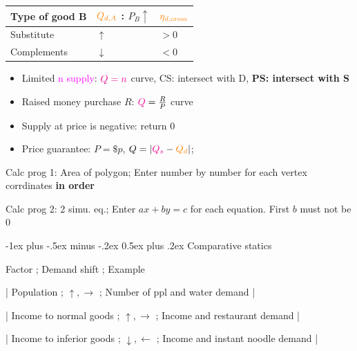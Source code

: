 \documentclass[a4paper]{article}
\makeatletter
\renewcommand{\section}{\@startsection{section}{1}{0mm}%
                                {-1ex plus -.5ex minus -.2ex}%
                                {0.5ex plus .2ex}%
                                {\normalfont\large\bfseries}}
\makeatother
\begin{document}
\begin{multicols*}{3}
    \begin{minipage}{\linewidth}
        \begin{tabular}{l|l|l}
            Type of good B & $\textcolor{orange}{Q_{d,A}}$ : $P_B \uparrow$ & $\textcolor{orange}{\eta_{d,\text{cross}}}$ \\
            \hline
            Substitute     & $\uparrow$                                     & $>0$                                        \\
            Complements    & $\downarrow$                                   & $<0$                                        \\
        \end{tabular}
    \end{minipage}

    \begin{itemize}
        \item Limited \textcolor{magenta}{n supply}: $\textcolor{magenta}{Q=n}$ curve, CS: intersect with D, \textbf{PS: intersect with S}
        \item Raised money purchase $R$: $\textcolor{magenta}{Q}=\frac{R}{P}$ curve
        \item Supply at price is negative: return 0
        \item Price guarantee: $P=\$p$, $Q=|\textcolor{magenta}{Q_s} - \textcolor{orange}{Q_d}|$;
    \end{itemize}

    \tiny

    Calc prog 1: Area of polygon; Enter number by number for each vertex corrdinates \textbf{in order}

    Calc prog 2: 2 simu. eq.; Enter $ax+by=c$ for each equation. First $b$ must not be 0

    \normalsize

    \section{Comparative statics}

    \tiny

    Factor ; Demand shift ; Example

    | Population ; $\uparrow, \rightarrow$ ; Number of ppl and water demand |

    | Income to normal goods ; $\uparrow, \rightarrow$ ; Income and restaurant demand |

    | Income to inferior goods ; $\downarrow, \leftarrow$ ; Income and instant noodle demand |


\end{multicols*}
\end{document}
